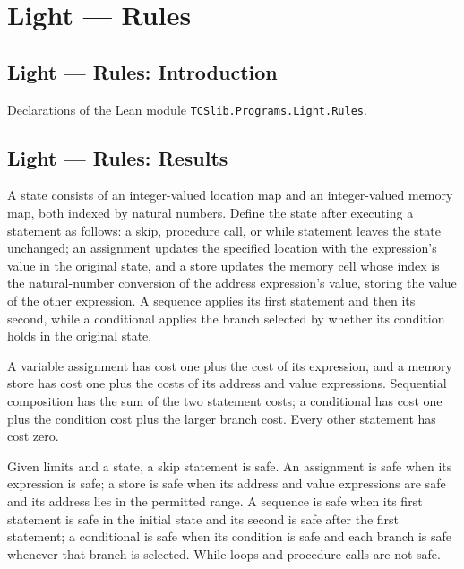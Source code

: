 \section{Light --- Rules}
\subsection*{Light --- Rules: Introduction}

Declarations of the Lean module \texttt{TCSlib.Programs.Light.Rules}.

\subsection*{Light --- Rules: Results}

\begin{definition}
\label{Light.Stmt.after}
\leanok
{}
A state consists of an integer-valued location map and an integer-valued memory map,
both indexed by natural numbers. Define the state after executing a statement as
follows: a skip, procedure call, or while statement leaves the state unchanged; an
assignment updates the specified location with the expression’s value in the original
state, and a store updates the memory cell whose index is the natural-number conversion
of the address expression’s value, storing the value of the other expression. A sequence
applies its first statement and then its second, while a conditional applies the branch
selected by whether its condition holds in the original state.
\end{definition}

\begin{definition}
\label{Light.Stmt.blockCost}
\leanok
{}
A variable assignment has cost one plus the cost of its expression, and a memory store
has cost one plus the costs of its address and value expressions. Sequential composition
has the sum of the two statement costs; a conditional has cost one plus the condition
cost plus the larger branch cost. Every other statement has cost zero.
\end{definition}

\begin{definition}
\label{Light.Stmt.BlockSafe}
\leanok
{}
Given limits and a state, a skip statement is safe. An assignment is safe when its
expression is safe; a store is safe when its address and value expressions are safe and
its address lies in the permitted range. A sequence is safe when its first statement is
safe in the initial state and its second is safe after the first statement; a
conditional is safe when its condition is safe and each branch is safe whenever that
branch is selected. While loops and procedure calls are not safe.
\end{definition}

